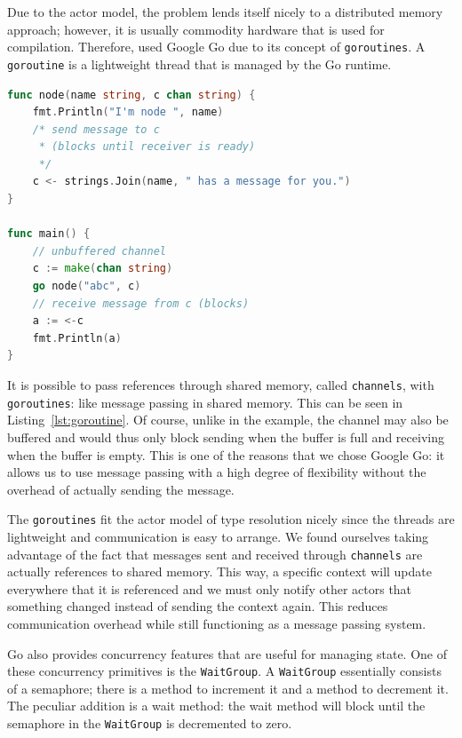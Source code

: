 \documentclass{acm_proc_article-sp}
\begin{document}
Due to the actor model, the problem lends itself nicely to a distributed memory
approach; however, it is usually commodity hardware that is used for
compilation. Therefore, used Google Go due to its concept of
\texttt{goroutines}. A \texttt{goroutine} is a lightweight thread that is
managed by the Go runtime.

\begin{lstlisting}[caption=Small \texttt{goroutine} example with
\texttt{channels},language=Go,label=lst:goroutine]
func node(name string, c chan string) {
	fmt.Println("I'm node ", name)
	/* send message to c
	 * (blocks until receiver is ready)
	 */
	c <- strings.Join(name, " has a message for you.")
}

func main() {
	// unbuffered channel
	c := make(chan string)
	go node("abc", c)
	// receive message from c (blocks)
	a := <-c
	fmt.Println(a)
}
\end{lstlisting}

It is possible to pass references through shared memory, called
\texttt{channels}, with \texttt{goroutines}: like message passing in shared
memory. This can be seen in Listing~\ref{lst:goroutine}. Of course, unlike in
the example, the channel may also be buffered and would thus only block sending
when the buffer is full and receiving when the buffer is empty. This is one of
the reasons that we chose Google Go: it allows us to use message passing
with a high degree of flexibility without the overhead of actually sending the message.


The \texttt{goroutines} fit the actor model of type resolution nicely since the
threads are lightweight and communication is easy to arrange. We found
ourselves taking advantage of the fact that messages sent and received through
\texttt{channels} are actually references to shared memory. This way, a
specific context will update everywhere that it is referenced and we must only
notify other actors that something changed instead of sending the context
again. This reduces communication overhead while still functioning as a message
passing system.

Go also provides concurrency features that are useful for managing state. One
of these concurrency primitives is the \texttt{WaitGroup}. A \texttt{WaitGroup}
essentially consists of a semaphore; there is a method to increment it and a
method to decrement it. The peculiar addition is a wait method: the wait method
will block until the semaphore in the \texttt{WaitGroup} is decremented to
zero.
\end{document}
